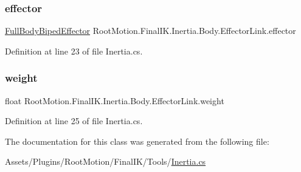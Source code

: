 \subsubsection{\texorpdfstring{effector}{effector}}
{\footnotesize\ttfamily \mbox{\hyperlink{namespace_root_motion_1_1_final_i_k_ae0dd2058c7667b6f132c11a6b860c14a}{Full\+Body\+Biped\+Effector}} Root\+Motion.\+Final\+I\+K.\+Inertia.\+Body.\+Effector\+Link.\+effector}



Definition at line 23 of file Inertia.\+cs.

\mbox{\label{class_root_motion_1_1_final_i_k_1_1_inertia_1_1_body_1_1_effector_link_ad7a750355925807a0643c3ca71888acb}} 
\subsubsection{\texorpdfstring{weight}{weight}}
{\footnotesize\ttfamily float Root\+Motion.\+Final\+I\+K.\+Inertia.\+Body.\+Effector\+Link.\+weight}



Definition at line 25 of file Inertia.\+cs.



The documentation for this class was generated from the following file\+:\begin{DoxyCompactItemize}
\item 
Assets/\+Plugins/\+Root\+Motion/\+Final\+I\+K/\+Tools/\mbox{\hyperlink{_inertia_8cs}{Inertia.\+cs}}\end{DoxyCompactItemize}
